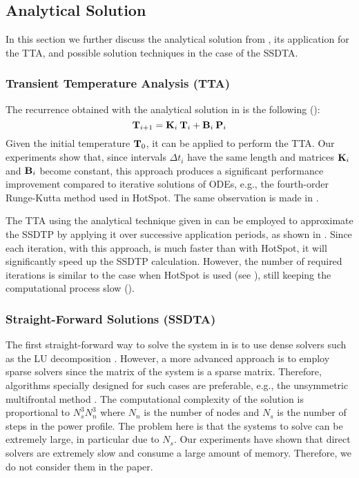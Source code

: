 \subsection{Analytical Solution}

In this section we further discuss the analytical solution from
, its application for the TTA, and possible solution
techniques in the case of the SSDTA.

\subsubsection{Transient Temperature Analysis (TTA)} 

The recurrence obtained with the analytical solution in  is the
following ():
\[
  \mathbf{T}_{i+1} = \mathbf{K}_i \: \mathbf{T}_i + \mathbf{B}_i \: \mathbf{P}_i
\]
Given the initial temperature $\mathbf{T}_0$, it can be applied to perform the TTA.
Our experiments show that, since intervals $\Delta t_i$ have the same length and
matrices $\mathbf{K}_i$ and $\mathbf{B}_i$ become constant, this approach produces a
significant performance improvement compared to iterative solutions of ODEs,
e.g., the fourth-order Runge-Kutta method used in HotSpot. The same observation
is made in \cite{thiele2011}.

The TTA using the analytical technique given in  can be
employed to approximate the SSDTP by applying it over successive application
periods, as shown in . Since each iteration,
with this approach, is much faster than with HotSpot, it will significantly
speed up the SSDTP calculation. However, the number of required iterations is
similar to the case when HotSpot is used (see ), still
keeping the computational process slow ().

\subsubsection{Straight-Forward Solutions (SSDTA)} 

The first straight-forward way to solve the system in  is to use
dense solvers such as the LU decomposition \cite{press2007}. However, a more
advanced approach is to employ sparse solvers since the matrix of the system is
a sparse matrix. Therefore, algorithms specially designed for such cases are
preferable, e.g., the unsymmetric multifrontal method \cite{davis2004}. The
computational complexity of the solution is proportional to $N_s^3 N_n^3$
\cite{press2007} where $N_n$ is the number of nodes and $N_s$ is the number of
steps in the power profile. The problem here is that the systems to solve can be
extremely large, in particular due to $N_s$. Our experiments have shown that
direct solvers are extremely slow and consume a large amount of memory.
Therefore, we do not consider them in the paper.

